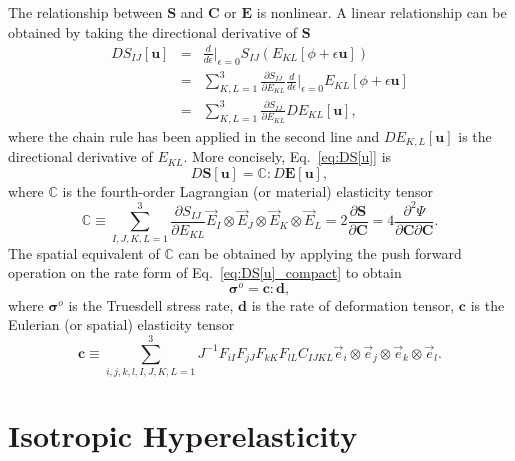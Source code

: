 \documentclass[12pt,aps,pre]{revtex4}
\begin{document}
The relationship between $\pmb{S}$ and $\pmb{C}$ or $\pmb{E}$ is nonlinear. A linear relationship can be obtained by taking the directional derivative of $\pmb{S}$
%
\begin{eqnarray}
DS_{IJ}[\pmb{u}] &=& \frac{d}{d\epsilon}\bigg|_{\epsilon=0}S_{IJ}(E_{KL}[\phi+\epsilon \pmb{u}]) \nonumber\\
%
&=& \sum_{K,L=1}^3 \frac{\partial S_{IJ}}{\partial E_{KL}}\frac{d}{d\epsilon}\bigg|_{\epsilon=0}E_{KL}[\phi+\epsilon \pmb{u}] \nonumber\\
%
&=&  \sum_{K,L=1}^3 \frac{\partial S_{IJ}}{\partial E_{KL}} DE_{KL}[\pmb{u}],
\label{eq:DS[u]}
\end{eqnarray}
%
where the chain rule has been applied in the second line and $DE_{K,L}[\pmb{u}]$ is the directional derivative of $E_{KL}$. More concisely, Eq.\ \eqref{eq:DS[u]} is
%
\begin{equation}
D\pmb{S}[\pmb{u}] = \pmb{\mathbb{C}}:D\pmb{E}[\pmb{u}],
\label{eq:DS[u]_compact}
\end{equation}
%
where $\pmb{\mathbb{C}}$ is the fourth-order Lagrangian (or material) elasticity tensor
%
\begin{equation}
\pmb{\mathbb{C}} \equiv \sum_{I,J,K,L=1}^3 \frac{\partial S_{IJ}}{\partial E_{KL}} \vec{E}_I \otimes \vec{E}_J \otimes \vec{E}_K \otimes \vec{E}_L = 2\frac{\partial \pmb{S}}{\partial \pmb{C}} = 4\frac{\partial^2 \Psi}{\partial \pmb{C} \partial \pmb{C}}.
\end{equation}
%
The spatial equivalent of $\pmb{\mathbb{C}}$ can be obtained by applying the push forward operation on the rate form of Eq.\ \eqref{eq:DS[u]_compact} to obtain \cite{JavierBonet:2008uxa}
%
\begin{equation}
\pmb{\sigma}^o = \pmb{c}:\pmb{d},
\end{equation}
%
where $\pmb{\sigma}^o$ is the Truesdell stress rate, $\pmb{d}$ is the rate of deformation tensor, $\pmb{c}$ is the Eulerian (or spatial) elasticity tensor
%
\begin{equation}
\pmb{c} \equiv \sum_{i,j,k,l,I,J,K,L=1}^3 J^{-1} F_{iI} F_{jJ} F_{kK} F_{lL} C_{IJKL} \vec{e}_i \otimes \vec{e}_j \otimes \vec{e}_k \otimes \vec{e}_l.
\end{equation}
%
\section{Isotropic Hyperelasticity}
\end{document}
